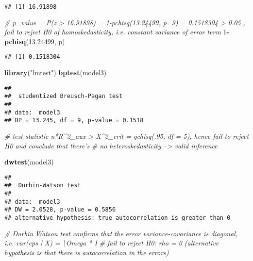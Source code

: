 \documentclass[
]{article}
\newenvironment{Shaded}{\begin{snugshade}}{\end{snugshade}}
\newcommand{\CommentTok}[1]{\textcolor[rgb]{0.56,0.35,0.01}{\textit{#1}}}
\newcommand{\DecValTok}[1]{\textcolor[rgb]{0.00,0.00,0.81}{#1}}
\newcommand{\FloatTok}[1]{\textcolor[rgb]{0.00,0.00,0.81}{#1}}
\newcommand{\KeywordTok}[1]{\textcolor[rgb]{0.13,0.29,0.53}{\textbf{#1}}}
\newcommand{\NormalTok}[1]{#1}
\newcommand{\OperatorTok}[1]{\textcolor[rgb]{0.81,0.36,0.00}{\textbf{#1}}}
\newcommand{\StringTok}[1]{\textcolor[rgb]{0.31,0.60,0.02}{#1}}
\begin{document}
\begin{verbatim}
## [1] 16.91898
\end{verbatim}

\begin{Shaded}
\begin{Highlighting}[]
\CommentTok{# p_value = P(z > 16.91898) = 1-pchisq(13.24499, p=9) = 0.1518304 > 0.05 ,  fail to reject H0 of homoskedasticity, i.e. constant variance of error term}
\DecValTok{1}\OperatorTok{-}\KeywordTok{pchisq}\NormalTok{(}\FloatTok{13.24499}\NormalTok{, p)}
\end{Highlighting}
\end{Shaded}

\begin{verbatim}
## [1] 0.1518304
\end{verbatim}

\begin{Shaded}
\begin{Highlighting}[]
\KeywordTok{library}\NormalTok{(}\StringTok{"lmtest"}\NormalTok{)}
\KeywordTok{bptest}\NormalTok{(model3)}
\end{Highlighting}
\end{Shaded}

\begin{verbatim}
## 
##  studentized Breusch-Pagan test
## 
## data:  model3
## BP = 13.245, df = 9, p-value = 0.1518
\end{verbatim}

\begin{Shaded}
\begin{Highlighting}[]
\CommentTok{# test statistic n*R^2_aux > X^2_crit = qchisq(.95, df = 5), hence fail to reject H0 and conclude that there's}
\CommentTok{# no heteroskedasticity --> valid inference}

\KeywordTok{dwtest}\NormalTok{(model3)}
\end{Highlighting}
\end{Shaded}

\begin{verbatim}
## 
##  Durbin-Watson test
## 
## data:  model3
## DW = 2.0528, p-value = 0.5856
## alternative hypothesis: true autocorrelation is greater than 0
\end{verbatim}

\begin{Shaded}
\begin{Highlighting}[]
\CommentTok{# Durbin Watson test confirms that the error variance-covariance is diagonal, i.e. var(eps | X) =  \textbackslash{}Omega * I}
\CommentTok{# fail to reject H0: rho = 0 (alternative hypothesis is that there is autocorrelation in the errors)}
\end{Highlighting}
\end{Shaded}
\end{document}
